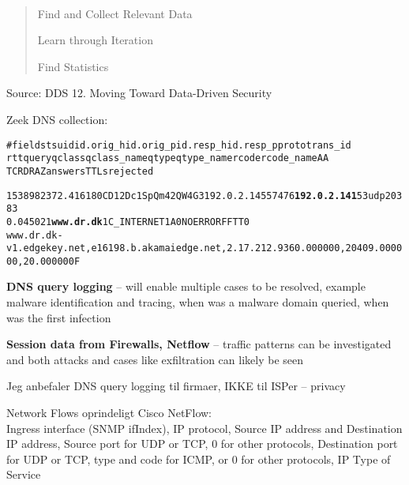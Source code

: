 \documentclass[Screen16to9,17pt]{foils}
\begin{document}

~ 

\vspace{-3cm}

\begin{quote}
\begin{list2}
\item Find and Collect Relevant Data
\item Learn through Iteration
\item Find Statistics
\end{list2}

\end{quote}
Source: DDS 12. Moving Toward Data-Driven Security



Zeek DNS collection:
\begin{alltt}\footnotesize
#fields ts      uid     id.orig_h       id.orig_p       id.resp_h       id.resp_p       proto   trans_id
        rtt     query   qclass  qclass_name     qtype   qtype_name      rcode   rcode_name      AA
        TC      RD      RA      Z       answers TTLs    rejected

1538982372.416180	CD12Dc1SpQm42QW4G3	192.0.2.145	57476	{\bf 192.0.2.141}	53	udp	20383
	0.045021	{\bf www.dr.dk}	1	C_INTERNET	1	A	0	NOERROR	F	F	T	T	0
www.dr.dk-v1.edgekey.net,e16198.b.akamaiedge.net,2.17.212.93	60.000000,20409.000000,20.000000 F
\end{alltt}

\begin{list2}
\item {\bf DNS query logging} -- will enable multiple cases to be resolved, example malware identification and tracing, when was a malware domain queried, when was the first infection
\item {\bf Session data from Firewalls, Netflow} -- traffic patterns can be investigated and both attacks and cases like exfiltration can likely be seen
\end{list2}

\centerline{Jeg anbefaler DNS query logging til firmaer, IKKE til ISPer -- privacy}




\begin{list1}
\item Network Flows oprindeligt Cisco NetFlow:\\
{\small Ingress interface (SNMP ifIndex), IP protocol, Source IP address and Destination IP address, Source port for UDP or TCP, 0 for other protocols, Destination port for UDP or TCP, type and code for ICMP, or 0 for other protocols, IP Type of Service}
\end{list1}
\end{document}
